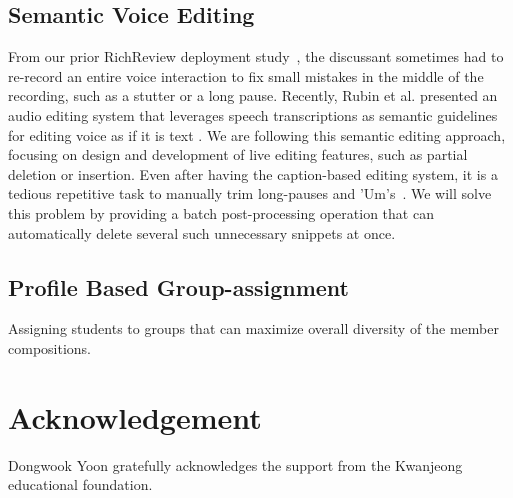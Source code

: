 \documentclass{sigchi}
\begin{document}
\subsection{Semantic Voice Editing}
From our prior RichReview deployment study~\cite{yoon2015richreview}, the discussant sometimes had to re-record an entire voice interaction to fix small mistakes in the middle of the recording, such as a stutter or a long pause.
Recently, Rubin et al. presented an audio editing system that leverages speech transcriptions as semantic guidelines for editing voice as if it is text \cite{rubin2013content}.
We are following this semantic editing approach, focusing on design and development of live editing features, such as partial deletion or insertion.
Even after having the caption-based editing system, it is a tedious repetitive task to manually trim long-pauses and 'Um's~\cite{yoon2014richreview}.
We will solve this problem by providing a batch post-processing operation that can automatically delete several such unnecessary snippets at once.

\subsection{Profile Based Group-assignment}
Assigning students to groups that can maximize overall diversity of the member compositions.

\section{Acknowledgement} 
Dongwook Yoon gratefully acknowledges the support from the Kwanjeong educational foundation.



\end{document}
